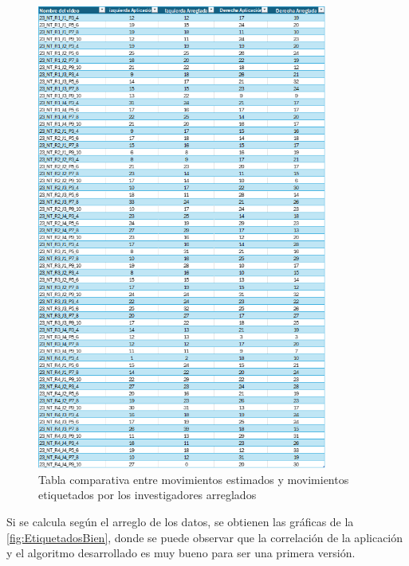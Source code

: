 \begin{figure}[H]
    \centering
    \includegraphics[width=0.85\textwidth]{images/7/ValidacionMovimientos.png}
    \caption{Tabla comparativa entre movimientos estimados y movimientos etiquetados por los investigadores arreglados}
    \label{fig:TablaResultados}
\end{figure}
\clearpage
Si se calcula según el arreglo de los datos, se obtienen las gráficas de la \autoref{fig:EtiquetadosBien}, donde se puede observar que la correlación de la aplicación y el algoritmo desarrollado es muy bueno para ser una primera versión.

